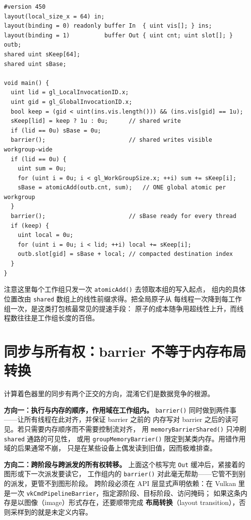 \documentclass[12pt,a4paper,fontset=fandol]{ctexbook}
\newcommand{\Fn}[1]{\texttt{#1()}}
\newcommand{\Tp}[1]{\texttt{#1}}
\newcommand{\Bk}{\discretionary{}{}{}}
\begin{document}
\begin{lstlisting}[style=glslstyle,caption={带共享内存与块内单次原子的打包核},label={lst:ch08-cull-compact}]
#version 450
layout(local_size_x = 64) in;
layout(binding = 0) readonly buffer In  { uint vis[]; } ins;
layout(binding = 1)          buffer Out { uint cnt; uint slot[]; } outb;
shared uint sKeep[64];
shared uint sBase;

void main() {
  uint lid = gl_LocalInvocationID.x;
  uint gid = gl_GlobalInvocationID.x;
  bool keep = (gid < uint(ins.vis.length())) && (ins.vis[gid] == 1u);
  sKeep[lid] = keep ? 1u : 0u;      // shared write
  if (lid == 0u) sBase = 0u;
  barrier();                        // shared writes visible workgroup-wide
  if (lid == 0u) {
    uint sum = 0u;
    for (uint i = 0u; i < gl_WorkGroupSize.x; ++i) sum += sKeep[i];
    sBase = atomicAdd(outb.cnt, sum);   // ONE global atomic per workgroup
  }
  barrier();                        // sBase ready for every thread
  if (keep) {
    uint local = 0u;
    for (uint i = 0u; i < lid; ++i) local += sKeep[i];
    outb.slot[gid] = sBase + local; // compacted destination index
  }
}
\end{lstlisting}

注意这里每个工作组只发一次 \Fn{atomicAdd} 去领取本组的写入起点，
组内的具体位置改由 \Tp{shared} 数组上的线性前缀求得。把全局原子从
每线程一次降到每工作组一次，是这类打包核最常见的提速手段：
原子的成本随争用超线性上升，而线程数往往是工作组长度的百倍。

\section{同步与所有权：barrier 不等于内存布局转换}

计算着色器里的同步有两个正交的方向，混淆它们是数据竞争的根源。

\textbf{方向一：执行与内存的顺序，作用域在工作组内。}
\Fn{barrier} 同时做到两件事——让所有线程在此对齐，并保证 barrier 之前的
内存写对 barrier 之后的读可见。若只需要内存顺序而不需要控制流对齐，
用 \Fn{memoryBarrierShared} 只冲刷 \Tp{shared} 通路的可见性，
或用 \Fn{groupMemoryBarrier} 限定到某类内存。用错作用域的后果通常不崩，
只是在某些设备上偶发读到旧值，因而极难排查。

\textbf{方向二：跨阶段与跨派发的所有权转移。}
上面这个核写完 \Tp{Out} 缓冲后，紧接着的图形或下一次派发要读它，
工作组内的 \Fn{barrier} 对此毫无帮助——它管不到别的派发，更管不到图形阶段。
跨阶段必须在 API 层显式声明依赖：在 Vulkan 里是一次
\Tp{vkCmdPipeline\Bk Barrier}，指定源阶段、目标阶段、访问掩码；
如果这条内存是以图像（image）形式存在，还要顺带完成
\textbf{布局转换}（layout transition），否则采样到的就是未定义内容。
\end{document}
